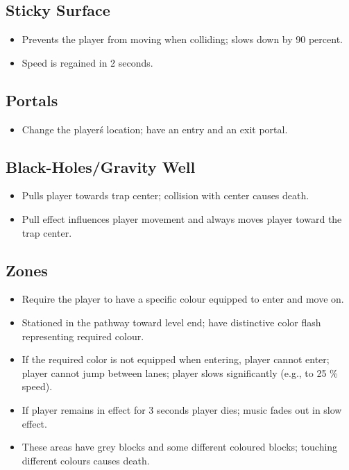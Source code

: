 \documentclass[11pt,a4paper]{report}
\begin{document}
\subsection{Sticky Surface}
\begin{itemize}
  \item Prevents the player from moving when colliding; slows down by 90 percent.
  \item Speed is regained in 2 seconds.
\end{itemize}

\subsection{Portals}
\begin{itemize}
  \item Change the player\'s location; have an entry and an exit portal.
\end{itemize}

\subsection{Black-Holes/Gravity Well}
\begin{itemize}
  \item Pulls player towards trap center; collision with center causes death.
  \item Pull effect influences player movement and always moves player toward the trap center.
\end{itemize}

\subsection{Zones}
\begin{itemize}
  \item Require the player to have a specific colour equipped to enter and move on.
  \item Stationed in the pathway toward level end; have distinctive color flash representing required colour.
  \item If the required color is not equipped when entering, player cannot enter; player cannot jump between lanes; player slows significantly (e.g., to 25 \% speed).
  \item If player remains in effect for 3 seconds player dies; music fades out in slow effect.
  \item These areas have grey blocks and some different coloured blocks; touching different colours causes death.
\end{itemize}
\end{document}
